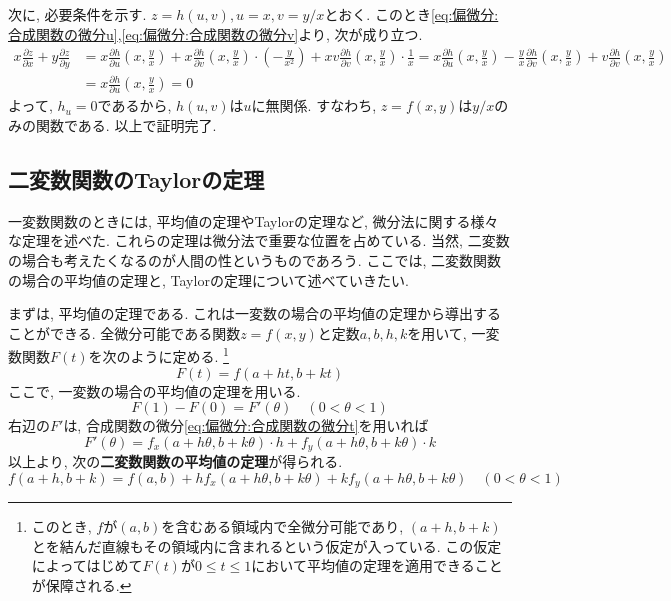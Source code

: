 \documentclass[a4j,dvipdfmx]{jsarticle}
\numberwithin{equation}{section}
\begin{document}
            次に, 必要条件を示す. $z=h(u,v),u=x,v=y/x$とおく. このとき\eqref{eq:偏微分:合成関数の微分u},\eqref{eq:偏微分:合成関数の微分v}より, 次が成り立つ.
            \begin{align*}
                x\frac{\partial z}{\partial x}+y\frac{\partial z}{\partial y}&=x\frac{\partial h}{\partial u}\left(x,\frac{y}{x}\right)+x\frac{\partial h}{\partial v}\left(x,\frac{y}{x}\right)\cdot \left(-\frac{y}{x^2}\right)+xv\frac{\partial h}{\partial v}\left(x,\frac{y}{x}\right)\cdot \frac{1}{x}=x\frac{\partial h}{\partial u}\left(x,\frac{y}{x}\right)-\frac{y}{x}\frac{\partial h}{\partial v}\left(x,\frac{y}{x}\right)+v\frac{\partial h}{\partial v}\left(x,\frac{y}{x}\right)\\
                &=x\frac{\partial h}{\partial u}\left(x,\frac{y}{x}\right)=0
            \end{align*}
            よって, $h_u=0$であるから, $h(u,v)$は$u$に無関係. すなわち, $z=f(x,y)$は$y/x$のみの関数である.
            以上で証明完了.
        \clearpage
        \subsection{二変数関数のTaylorの定理}
            一変数関数のときには, 平均値の定理やTaylorの定理など, 微分法に関する様々な定理を述べた. これらの定理は微分法で重要な位置を占めている. 当然, 二変数の場合も考えたくなるのが人間の性というものであろう. 
            ここでは, 二変数関数の場合の平均値の定理と, Taylorの定理について述べていきたい.

            まずは, 平均値の定理である. これは一変数の場合の平均値の定理から導出することができる. 全微分可能である関数$z=f(x,y)$と定数$a,b,h,k$を用いて, 一変数関数$F(t)$を次のように定める.
            \footnote{このとき, $f$が$(a,b)$を含むある領域内で全微分可能であり, $(a+h,b+k)$とを結んだ直線もその領域内に含まれるという仮定が入っている. この仮定によってはじめて$F(t)$が$0\leq t\leq 1$において平均値の定理を適用できることが保障される.}
            \begin{equation*}
                F(t)=f(a+ht,b+kt)
            \end{equation*}
            ここで, 一変数の場合の平均値の定理を用いる.
            \begin{equation*}
                F(1)-F(0)=F'(\theta)\quad(0<\theta<1)
            \end{equation*}
            右辺の$F'$は, 合成関数の微分\eqref{eq:偏微分:合成関数の微分t}を用いれば
            \begin{equation*}
                F'(\theta)=f_x(a+h\theta,b+k\theta)\cdot h+f_y(a+h\theta,b+k\theta)\cdot k
            \end{equation*}
            以上より, 次の\textbf{二変数関数の平均値の定理}が得られる.
            \begin{equation}
                f(a+h,b+k)=f(a,b)+hf_x(a+h\theta,b+k\theta)+kf_y(a+h\theta,b+k\theta) \quad (0<\theta<1) \label{eq:偏微分:二変数関数の平均値の定理}
            \end{equation}
\end{document}
